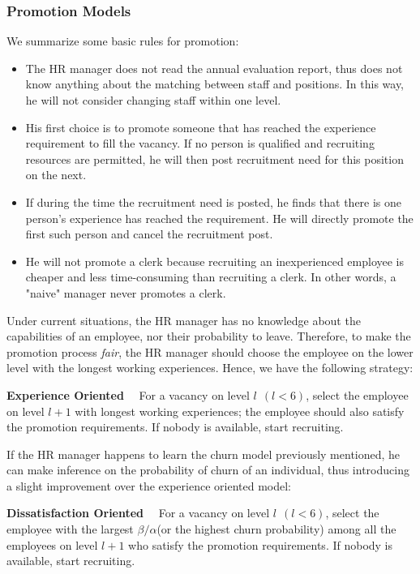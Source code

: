 \documentclass[tcn = 37075, sheet = false, abstract = false]{mcmthesis}
\begin{document}
\subsubsection{Promotion Models}
We summarize some basic rules for promotion:
\begin{itemize}
\item The HR manager does not read the annual evaluation report, thus does not know anything about the matching between staff and positions. In this way, he will not consider changing staff within one level.
\item His first choice is to promote someone that has reached the experience requirement to fill the vacancy. If no person is qualified and recruiting resources are permitted, he will then post recruitment need for this position on the next.
\item If during the time the recruitment need is posted, he finds that there is one person's experience has reached the requirement. He will directly promote the first such person and cancel the recruitment post.
\item He will not promote a clerk because recruiting an inexperienced employee is cheaper and less time-consuming than recruiting a clerk. In other words, a "naive" manager never promotes a clerk.
\end{itemize}

Under current situations, the HR manager has no knowledge about the capabilities of an employee, nor their probability to leave. Therefore, to make the promotion process \textit{fair}, the HR manager should choose the employee on the lower level with the longest working experiences. Hence, we have the following strategy:


\noindent \textbf{Experience Oriented} \ \ For a vacancy on level $l ~~ (l < 6)$, select the employee on level $l+1$ with longest working experiences; the employee should also satisfy the promotion requirements. If nobody is available, start recruiting.

If the HR manager happens to learn the churn model previously mentioned, he can make inference on the probability of churn of an individual, thus introducing a slight improvement over the experience oriented model:


\noindent \textbf{Dissatisfaction Oriented} \ \  For a vacancy on level $l ~~ (l < 6)$, select the employee with the largest $\beta / \alpha$(or the highest churn probability) among all the employees on level $l+1$ who satisfy the promotion requirements. If nobody is available, start recruiting.
\end{document}
